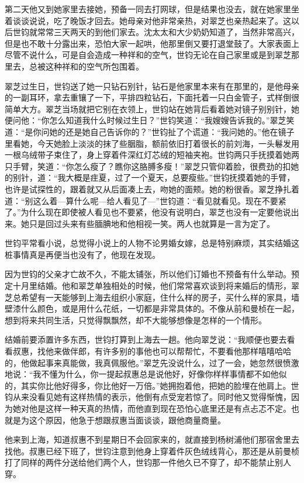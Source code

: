 \par 第二天他又到她家里去接她，预备一同去打网球，但是结果也没去，就在她家里坐着谈谈说说，吃了晚饭才回去。她母亲对他非常亲热，对翠芝也亲热起来了。这以后世钧就常常三天两天的到他们家去。沈太太和大少奶奶知道了，当然非常高兴，但是也不敢十分露出来，恐怕大家一起哄，他那里倒又要打退堂鼓了。大家表面上尽管不说什么，可是自会造成一种祥和的空气，世钧无论在自己家里或是到翠芝那里去，总被这种祥和的空气所包围着。
\par 翠芝过生日，世钧送了她一只钻石别针，钻石是他家里本来有在那里的，是他母亲的一副耳环，拿去重镶了一下，平排四粒钻石，下面托着一只白金管子，式样倒很简单大方。翠芝当场就把它别在衣领上，世钧站在她背后看着她对镜子别别针，她便问他：“你怎么知道我什么时候过生日？”世钧笑道：“我嫂嫂告诉我的。”翠芝笑道：“是你问她的还是她自己告诉你的？”世钧扯了个谎道：“我问她的。”他在镜子里看她，今天她脸上淡淡的抹了些胭脂，额前依旧打着很长的前刘海，一头鬈发用一根乌绒带子束住了，身上穿着件深红灯芯绒的短袖夹袍。世钧两只手抚摸着她两只手臂，笑道：“你怎么瘦了？瞧你这胳膊多瘦！”翠芝只管仰着脸，很费劲的扣她的别针，道：“我大概是疰夏，过了一个夏天，总要瘦些。”世钧抚摸着她的手臂，也许是试探性的，跟着就又从后面凑上去，吻她的面颊。她的粉很香。翠芝挣扎着道：“别这么着—算什么呢—给人看见了—”世钧道：“看见就看见。现在不要紧了。”为什么现在即使被人看见也不要紧，他没有说明白，翠芝也没有一定要他说出来。她只是回过头来有些腼腆地和他相视一笑。两人也就算是一言为定了。
\par 世钧平常看小说，总觉得小说上的人物不论男婚女嫁，总是特别麻烦，其实结婚这桩事情真是再便当也没有了，他现在发现。
\par 因为世钧的父亲才亡故不久，不能太铺张，所以他们订婚也不预备有什么举动。预定十月里结婚。他和翠芝单独相处的时候，他们常常喜欢谈到将来婚后的情形，翠芝总希望有一天能够到上海去组织小家庭，住什么样的房子，买什么样的家具，墙壁漆什么颜色，或是用什么花纸，一切都是非常具体的。不像从前和曼桢在一起，想到将来共同生活，只觉得飘飘然，却不大能够想像是怎样的一个情形。
\par 结婚前要添置许多东西，世钧打算到上海去一趟。他向翠芝说：“我顺便也要去看看叔惠，找他来做伴郎，有许多别的事他也可以帮帮忙，不要看他那样嘻嘻哈哈的，他做起事来真能做，我真佩服他。”翠芝先没说什么，过了一会，她忽然很愤激地说：“我不懂为什么，你一提起叔惠总是说他好，好像你样样事情都不如他似的，其实你比他好得多，你比他好一万倍。”她拥抱着他，把她的脸埋在他肩上。世钧从来没看见她有这样热情的表示，他倒有点受宠若惊了。同时他又觉得惭愧，因为她对他是这样一种天真的热情，而他直到现在恐怕心底里还是有点忐忑不定。也就是为这个原因，他急于想跟叔惠当面谈谈，跟他商量商量。
\par 他来到上海，知道叔惠不到星期日不会回家来的，就直接到杨树浦他们那宿舍里去找他。叔惠已经下班了，世钧注意到他身上穿着件灰色绒线背心，那还是从前曼桢打了同样的两件分送给他们两个人，世钧那一件他久已不穿了，却不能禁止别人穿。
